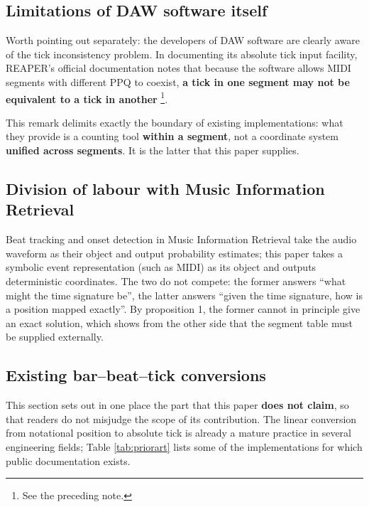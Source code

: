 \documentclass[11pt,a4paper]{article}
\begin{document}
\subsection{Limitations of DAW software itself}

Worth pointing out separately: the developers of DAW software are clearly aware of the
tick inconsistency problem. In documenting its absolute tick input facility, REAPER's
official documentation notes that because the software allows MIDI segments with
different PPQ to coexist, \textbf{a tick in one segment may not be equivalent to a tick
in another} \footnote{See the preceding note.}.

This remark delimits exactly the boundary of existing implementations: what they
provide is a counting tool \textbf{within a segment}, not a coordinate system
\textbf{unified across segments}. It is the latter that this paper supplies.

\subsection{Division of labour with Music Information Retrieval}

Beat tracking and onset detection in Music Information Retrieval take the audio
waveform as their object and output probability estimates; this paper takes a symbolic
event representation (such as MIDI) as its object and outputs deterministic
coordinates. The two do not compete: the former answers ``what might the time signature
be'', the latter answers ``given the time signature, how is a position mapped
exactly''. By proposition 1, the former cannot in principle give an exact solution,
which shows from the other side that the segment table must be supplied externally.

\subsection{Existing bar--beat--tick conversions}

This section sets out in one place the part that this paper \textbf{does not claim}, so
that readers do not misjudge the scope of its contribution. The linear conversion from
notational position to absolute tick is already a mature practice in several
engineering fields; Table \ref{tab:priorart} lists some of the implementations for
which public documentation exists.
\end{document}
